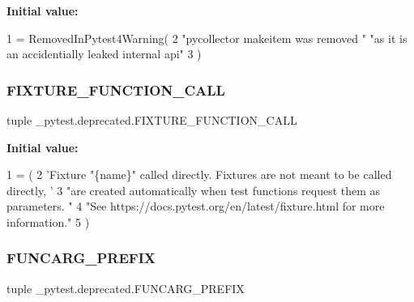 {\bfseries Initial value\+:}
\begin{DoxyCode}
1 =  RemovedInPytest4Warning(
2     \textcolor{stringliteral}{"pycollector makeitem was removed "} \textcolor{stringliteral}{"as it is an accidentially leaked internal api"}
3 )
\end{DoxyCode}
\mbox{\label{namespace__pytest_1_1deprecated_a64e9d4c52bcaf77a312e98284d29d947}} 
\subsubsection{\texorpdfstring{F\+I\+X\+T\+U\+R\+E\+\_\+\+F\+U\+N\+C\+T\+I\+O\+N\+\_\+\+C\+A\+LL}{FIXTURE\_FUNCTION\_CALL}}
{\footnotesize\ttfamily tuple \+\_\+pytest.\+deprecated.\+F\+I\+X\+T\+U\+R\+E\+\_\+\+F\+U\+N\+C\+T\+I\+O\+N\+\_\+\+C\+A\+LL}

{\bfseries Initial value\+:}
\begin{DoxyCode}
1 =  (
2     \textcolor{stringliteral}{'Fixture "\{name\}" called directly. Fixtures are not meant to be called directly, '}
3     \textcolor{stringliteral}{"are created automatically when test functions request them as parameters. "}
4     \textcolor{stringliteral}{"See https://docs.pytest.org/en/latest/fixture.html for more information."}
5 )
\end{DoxyCode}
\mbox{\label{namespace__pytest_1_1deprecated_ae5b330917f487965276f917f74c34948}} 
\subsubsection{\texorpdfstring{F\+U\+N\+C\+A\+R\+G\+\_\+\+P\+R\+E\+F\+IX}{FUNCARG\_PREFIX}}
{\footnotesize\ttfamily tuple \+\_\+pytest.\+deprecated.\+F\+U\+N\+C\+A\+R\+G\+\_\+\+P\+R\+E\+F\+IX}

